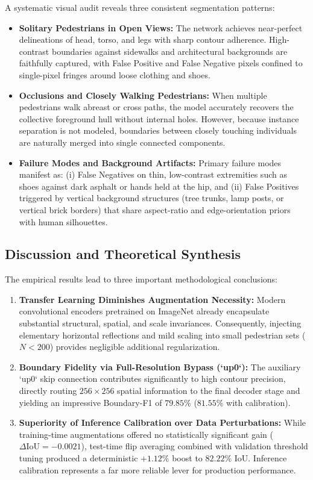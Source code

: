 \documentclass[10pt,a4paper]{article}
\begin{document}
A systematic visual audit reveals three consistent segmentation patterns:
\begin{itemize}
    \item \textbf{Solitary Pedestrians in Open Views:} The network achieves near-perfect delineations of head, torso, and legs with sharp contour adherence. High-contrast boundaries against sidewalks and architectural backgrounds are faithfully captured, with False Positive and False Negative pixels confined to single-pixel fringes around loose clothing and shoes.
    \item \textbf{Occlusions and Closely Walking Pedestrians:} When multiple pedestrians walk abreast or cross paths, the model accurately recovers the collective foreground hull without internal holes. However, because instance separation is not modeled, boundaries between closely touching individuals are naturally merged into single connected components.
    \item \textbf{Failure Modes and Background Artifacts:} Primary failure modes manifest as: (i) False Negatives on thin, low-contrast extremities such as shoes against dark asphalt or hands held at the hip, and (ii) False Positives triggered by vertical background structures (tree trunks, lamp posts, or vertical brick borders) that share aspect-ratio and edge-orientation priors with human silhouettes.
\end{itemize}

\subsection{Discussion and Theoretical Synthesis}
The empirical results lead to three important methodological conclusions:
\begin{enumerate}
    \item \textbf{Transfer Learning Diminishes Augmentation Necessity:} Modern convolutional encoders pretrained on ImageNet already encapsulate substantial structural, spatial, and scale invariances. Consequently, injecting elementary horizontal reflections and mild scaling into small pedestrian sets ($N < 200$) provides negligible additional regularization.
    \item \textbf{Boundary Fidelity via Full-Resolution Bypass (`up0`):} The auxiliary `up0` skip connection contributes significantly to high contour precision, directly routing $256 \times 256$ spatial information to the final decoder stage and yielding an impressive Boundary-F1 of $79.85\%$ ($81.55\%$ with calibration).
    \item \textbf{Superiority of Inference Calibration over Data Perturbations:} While training-time augmentations offered no statistically significant gain ($\Delta \text{IoU} = -0.0021$), test-time flip averaging combined with validation threshold tuning produced a deterministic $+1.12\%$ boost to $82.22\%$ IoU. Inference calibration represents a far more reliable lever for production performance.
\end{enumerate}
\end{document}
